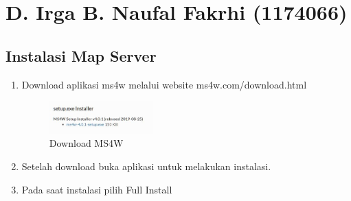 \section{D. Irga B. Naufal Fakrhi (1174066)}
\subsection{Instalasi Map Server}
\begin{enumerate}
    \item Download aplikasi ms4w melalui website ms4w.com/download.html
    \hfill\break
    \begin{figure}[H]
		\includegraphics[width=4cm]{figures/tugas4/1174066/1.jpg}
		\centering
		\caption{Download MS4W}
    \end{figure}
    \hfill\break

    \item Setelah download buka aplikasi untuk melakukan instalasi.
    \item Pada saat instalasi pilih Full Install
\end{enumerate}

